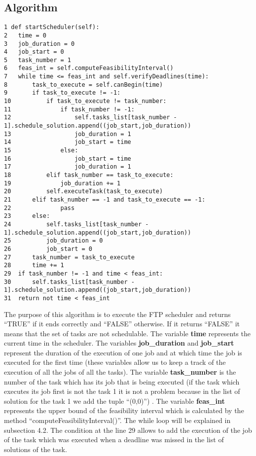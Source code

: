\documentclass[a4paper,12pt]{article}
\begin{document}
\subsection{Algorithm}

\begin{lstlisting}
1 def startScheduler(self):
2	time = 0
3	job_duration = 0
4	job_start = 0 
5	task_number = 1
6	feas_int = self.computeFeasibilityInterval()
7	while time <= feas_int and self.verifyDeadlines(time):
8		task_to_execute = self.canBegin(time)
9		if task_to_execute != -1:
10			if task_to_execute != task_number:
11				if task_number != -1:
12					self.tasks_list[task_number - 1].schedule_solution.append((job_start,job_duration))
13					job_duration = 1
14					job_start = time
15				else:
16					job_start = time
17					job_duration = 1
18			elif task_number == task_to_execute:
19				job_duration += 1
20			self.executeTask(task_to_execute)
21		elif task_number == -1 and task_to_execute == -1:
22				pass
23		else:
24			self.tasks_list[task_number - 1].schedule_solution.append((job_start,job_duration))
25			job_duration = 0
26			job_start = 0 
27		task_number = task_to_execute
28		time += 1
29	if task_number != -1 and time < feas_int:
30		self.tasks_list[task_number - 1].schedule_solution.append((job_start,job_duration))
31	return not time < feas_int
\end{lstlisting}

\smallskip
\noindent
The purpose of this algorithm is to execute the FTP scheduler and returns ``TRUE'' if it ends correctly and ``FALSE'' otherwise. If it returns ``FALSE'' it means that the set of tasks are not schedulable. The variable \textbf{time} represents the current time in the scheduler. The variables \textbf{job\_duration} and \textbf{job\_start} represent the duration of the execution of one job and at which time the job is executed for the first time (these variables allow us to keep a track of the execution of all the jobs of all the tasks). The variable \textbf{task\_number} is the number of the task which has its job that is being executed (if the task which executes its job first is not the task 1 it is not a problem because in the list of solution for the task 1 we add the tuple ``(0,0)'') . The variable \textbf{feas\_int} represents the upper bound of the feasibility interval which is calculated by the method ``computeFeasibilityInterval()''. The while loop will be explained in subsection 4.2. The condition at the line 29 allows to add the execution of the job of the task which was executed when a deadline was missed in the list of solutions of the task.
\end{document}
